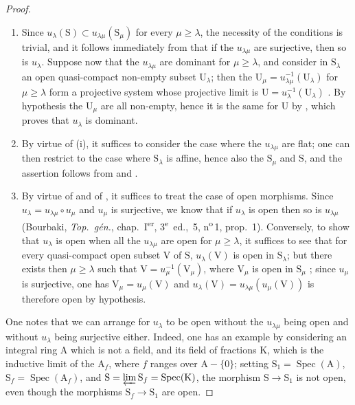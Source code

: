 \begin{proof}
\begin{enumerate}[label=(\roman*)]
  \item Since $u_\lambda(\mathrm{S})\subset u_{\lambda\mu}(\mathrm{S}_\mu)$ for every $\mu\geqslant\lambda$, the necessity of the conditions is trivial, and it follows immediately from  that if the $u_{\lambda\mu}$ are surjective, then so is $u_\lambda$.
Suppose now that the $u_{\lambda\mu}$ are dominant for $\mu\geqslant\lambda$, and consider in $\mathrm{S}_\lambda$ an open quasi-compact non-empty subset $\mathrm{U}_\lambda$; then the $\mathrm{U}_\mu=u_{\lambda\mu}^{-1}(\mathrm{U}_\lambda)$ for $\mu\geqslant\lambda$ form a projective system whose projective limit is $\mathrm{U}=u_\lambda^{-1}(\mathrm{U}_\lambda)$ .
By hypothesis the $\mathrm{U}_\mu$ are all non-empty, hence it is the same for $\mathrm{U}$ by , which proves that $u_\lambda$ is dominant.

  \item By virtue of (i), it suffices to consider the case where the $u_{\lambda\mu}$ are flat; one can then restrict to the case where $\mathrm{S}_\lambda$ is affine, hence also the $\mathrm{S}_\mu$ and $\mathrm{S}$, and the assertion follows from  and .

  \item By virtue of  and of , it suffices to treat the case of open morphisms.
Since $u_\lambda=u_{\lambda\mu}\circ u_\mu$ and $u_\mu$ is surjective, we know that if $u_\lambda$ is open then so is $u_{\lambda\mu}$ (Bourbaki, \emph{Top.\ g\'{e}n.}, chap.~I\textsuperscript{er}, 3\textsuperscript{e}~ed., \textsection\,5, n\textsuperscript{o}\,1, prop.~1).
Conversely, to show that $u_\lambda$ is open when all the $u_{\lambda\mu}$ are open for $\mu\geqslant\lambda$, it suffices to see that for every quasi-compact open subset $\mathrm{V}$ of $\mathrm{S}$, $u_\lambda(\mathrm{V})$ is open in $\mathrm{S}_\lambda$; but there exists then $\mu\geqslant\lambda$ such that $\mathrm{V}=u_\mu^{-1}(\mathrm{V}_\mu)$, where $\mathrm{V}_\mu$ is open in $\mathrm{S}_\mu$ ; since $u_\mu$ is surjective, one has $\mathrm{V}_\mu=u_\mu(\mathrm{V})$ and $u_\lambda(\mathrm{V})=u_{\lambda\mu}(u_\mu(\mathrm{V}))$ is therefore open by hypothesis.
\end{enumerate}

One notes that we can arrange for $u_\lambda$ to be open without the $u_{\lambda\mu}$ being open and without $u_\lambda$ being surjective either.
Indeed, one has an example by considering an integral ring $\mathrm{A}$ which is not a field, and its field of fractions $\mathrm{K}$, which is the inductive limit of the $\mathrm{A}_f$, where $f$ ranges over $\mathrm{A}-\{0\}$; setting $\mathrm{S}_1=\operatorname{Spec}(\mathrm{A})$, $\mathrm{S}_f=\operatorname{Spec}(\mathrm{A}_f)$, and $\mathrm{S}=\varprojlim\mathrm{S}_f=\operatorname{Spec}(\mathrm{K})$, the morphism $\mathrm{S}\to\mathrm{S}_1$ is not open, even though the morphisms $\mathrm{S}_f\to\mathrm{S}_1$ are open.
\end{proof}

